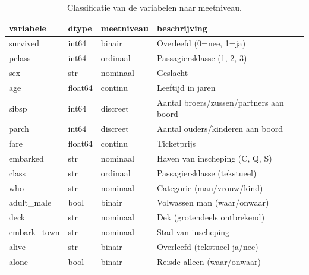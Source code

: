 \begin{table}[htbp]
\caption{Classificatie van de variabelen naar meetniveau.}
\label{tab:meetniveau}
\begin{tabular}{llll}
\toprule
variabele & dtype & meetniveau & beschrijving \\
\midrule
survived & int64 & binair & Overleefd (0=nee, 1=ja) \\
pclass & int64 & ordinaal & Passagiersklasse (1, 2, 3) \\
sex & str & nominaal & Geslacht \\
age & float64 & continu & Leeftijd in jaren \\
sibsp & int64 & discreet & Aantal broers/zussen/partners aan boord \\
parch & int64 & discreet & Aantal ouders/kinderen aan boord \\
fare & float64 & continu & Ticketprijs \\
embarked & str & nominaal & Haven van inscheping (C, Q, S) \\
class & str & ordinaal & Passagiersklasse (tekstueel) \\
who & str & nominaal & Categorie (man/vrouw/kind) \\
adult\_male & bool & binair & Volwassen man (waar/onwaar) \\
deck & str & nominaal & Dek (grotendeels ontbrekend) \\
embark\_town & str & nominaal & Stad van inscheping \\
alive & str & binair & Overleefd (tekstueel ja/nee) \\
alone & bool & binair & Reisde alleen (waar/onwaar) \\
\bottomrule
\end{tabular}
\end{table}
